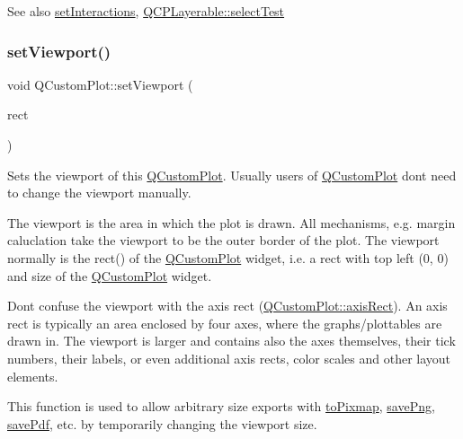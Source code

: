 \begin{DoxySeeAlso}{See also}
\hyperlink{class_q_custom_plot_a5ee1e2f6ae27419deca53e75907c27e5}{set\+Interactions}, \hyperlink{class_q_c_p_layerable_a04db8351fefd44cfdb77958e75c6288e}{Q\+C\+P\+Layerable\+::select\+Test} 
\end{DoxySeeAlso}
\mbox{\label{class_q_custom_plot_a3f9bc4b939dd8aaba9339fd09f273fc4}} 
\subsubsection{\texorpdfstring{set\+Viewport()}{setViewport()}}
{\footnotesize\ttfamily void Q\+Custom\+Plot\+::set\+Viewport (\begin{DoxyParamCaption}\item[{const Q\+Rect \&}]{rect }\end{DoxyParamCaption})}

Sets the viewport of this \hyperlink{class_q_custom_plot}{Q\+Custom\+Plot}. Usually users of \hyperlink{class_q_custom_plot}{Q\+Custom\+Plot} don\textquotesingle{}t need to change the viewport manually.

The viewport is the area in which the plot is drawn. All mechanisms, e.\+g. margin caluclation take the viewport to be the outer border of the plot. The viewport normally is the rect() of the \hyperlink{class_q_custom_plot}{Q\+Custom\+Plot} widget, i.\+e. a rect with top left (0, 0) and size of the \hyperlink{class_q_custom_plot}{Q\+Custom\+Plot} widget.

Don\textquotesingle{}t confuse the viewport with the axis rect (\hyperlink{class_q_custom_plot_ae5eefcb5f6ca26689b1fd4f6e25b42f9}{Q\+Custom\+Plot\+::axis\+Rect}). An axis rect is typically an area enclosed by four axes, where the graphs/plottables are drawn in. The viewport is larger and contains also the axes themselves, their tick numbers, their labels, or even additional axis rects, color scales and other layout elements.

This function is used to allow arbitrary size exports with \hyperlink{class_q_custom_plot_aabb974d71ce96c137dc04eb6eab844fe}{to\+Pixmap}, \hyperlink{class_q_custom_plot_ac92cc9256d12f354b40a4be4600b5fb9}{save\+Png}, \hyperlink{class_q_custom_plot_ad5acd34f6b39c3516887d7e54fec2412}{save\+Pdf}, etc. by temporarily changing the viewport size. \mbox{\label{class_q_custom_plot_a1be68d5c0f1e086d6374d1340a193fb9}} 
